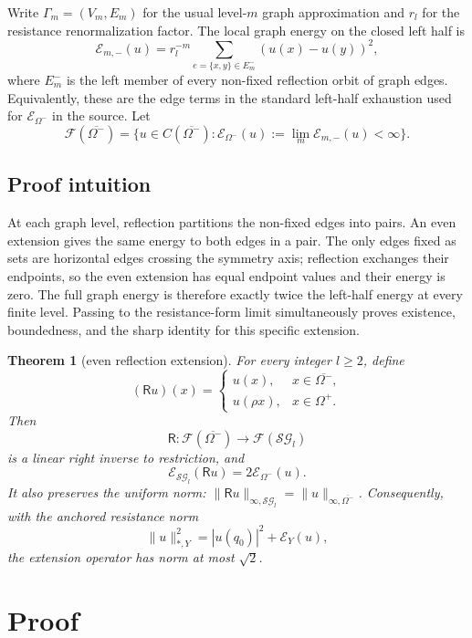 \documentclass[11pt]{article}
\newtheorem{theorem}{Theorem}
\newcommand{\SG}{\mathcal{SG}}
\newcommand{\E}{\mathcal E}
\newcommand{\F}{\mathcal F}
\newcommand{\R}{\mathsf R}
\begin{document}
Write $\Gamma_m=(V_m,E_m)$ for the usual level-$m$ graph approximation and
$r_l$ for the resistance renormalization factor.  The local graph energy on
the closed left half is
\[
 \E_{m,-}(u)=r_l^{-m}
   \sum_{e=\{x,y\}\in E_m^-}(u(x)-u(y))^2,
\]
where $E_m^-$ is the left member of every non-fixed reflection orbit of graph
edges.  Equivalently, these are the edge terms in the standard left-half
exhaustion used for $\E_{\Omega^-}$ in the source.  Let
\[
 \F(\overline{\Omega^-})
 =\{u\in C(\overline{\Omega^-}):
       \E_{\Omega^-}(u):=\lim_m\E_{m,-}(u)<\infty\}.
\]

\subsection*{Proof intuition}

At each graph level, reflection partitions the non-fixed edges into pairs.
An even extension gives the same energy to both edges in a pair.  The only
edges fixed as sets are horizontal edges crossing the symmetry axis; reflection
exchanges their endpoints, so the even extension has equal endpoint values and
their energy is zero.  The full graph energy is therefore exactly twice the
left-half energy at every finite level.  Passing to the resistance-form limit
simultaneously proves existence, boundedness, and the sharp identity for this
specific extension.

\begin{theorem}[even reflection extension]\label{thm:main}
For every integer $l\geq2$, define
\[
  (\R u)(x)=
  \begin{cases}
    u(x),&x\in\overline{\Omega^-},\\
    u(\rho x),&x\in\Omega^+.
  \end{cases}
\]
Then
\[
  \R:\F(\overline{\Omega^-})\longrightarrow\F(\SG_l)
\]
is a linear right inverse to restriction, and
\begin{equation}\label{eq:energy}
  \E_{\SG_l}(\R u)=2\E_{\Omega^-}(u).
\end{equation}
It also preserves the uniform norm:
$\|\R u\|_{\infty,\SG_l}=\|u\|_{\infty,\overline{\Omega^-}}$.
Consequently, with the anchored resistance norm
\[
 \|u\|_{*,Y}^2=|u(q_0)|^2+\E_Y(u),
\]
the extension operator has norm at most $\sqrt2$.
\end{theorem}

\section{Proof}
\end{document}
